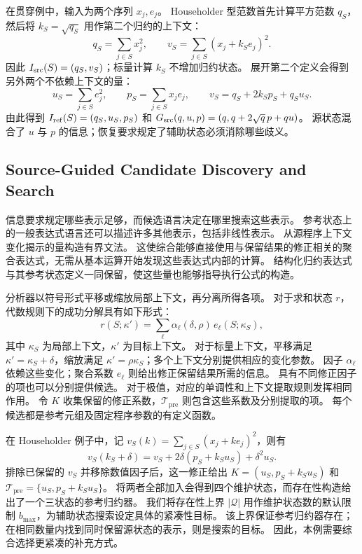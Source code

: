 在贯穿例中，输入为两个序列 $x_j,e_j$。
Householder 型范数首先计算平方范数 $q_S$，然后将 $k_S=\sqrt{q_S}$ 用作第二个归约的上下文：
\[
q_S=\sum_{j\in S}x_j^2,\qquad
v_S=\sum_{j\in S}(x_j+k_Se_j)^2.
\]
因此 $I_{\mathrm{src}}(S)=(q_S,v_S)$；标量计算 $k_S$ 不增加归约状态。
展开第二个定义会得到另外两个不依赖上下文的量：
\[
u_S=\sum_{j\in S}e_j^2,\qquad
p_S=\sum_{j\in S}x_je_j,\qquad
v_S=q_S+2k_Sp_S+q_Su_S.
\]
由此得到 $I_{\mathrm{ref}}(S)=(q_S,u_S,p_S)$ 和
$G_{\mathrm{src}}(q,u,p)=(q,q+2\sqrt q\,p+qu)$。
源状态混合了 $u$ 与 $p$ 的信息；恢复要求规定了辅助状态必须消除哪些歧义。

\subsection{Source-Guided Candidate Discovery and Search}
\label{sec:synthesis}

信息要求规定哪些表示足够，而候选语言决定在哪里搜索这些表示。
参考状态上的一般表达式语言还可以描述许多其他表示，包括非线性表示。
\sys 从源程序上下文变化揭示的量构造有界文法。
这使综合能够直接使用与保留结果的修正相关的聚合表达式，无需从基本运算开始发现这些表达式内部的计算。
结构化归约表达式与其参考状态定义一同保留，使这些量也能够指导执行公式的构造。

分析器以符号形式平移或缩放局部上下文，再分离所得各项。
对于求和状态 $r$，代数规则下的成功分解具有如下形式：
\begin{equation}
\label{eq:features}
r(S;\kappa')=\sum_{\ell}\alpha_\ell(\delta,\rho)\,e_\ell(S;\kappa_S),
\end{equation}
其中 $\kappa_S$ 为局部上下文，$\kappa'$ 为目标上下文。
对于标量上下文，平移满足 $\kappa'=\kappa_S+\delta$，缩放满足 $\kappa'=\rho\kappa_S$；多个上下文分别提供相应的变化参数。
因子 $\alpha_\ell$ 依赖这些变化；聚合系数 $e_\ell$ 则给出修正保留结果所需的信息。
具有不同修正因子的项也可以分别提供候选。
对于极值，对应的单调性和上下文提取规则发挥相同作用。
令 $K$ 收集保留的修正系数，$\mathcal T_{\mathrm{pre}}$ 则包含这些系数及分别提取的项。
每个候选都是参考元组及固定程序参数的有定义函数。

在 Householder 例子中，记 $v_S(k)=\sum_{j\in S}(x_j+ke_j)^2$，则有
\[
v_S(k_S+\delta)
 =v_S+2\delta(p_S+k_Su_S)+\delta^2u_S.
\]
排除已保留的 $v_S$ 并移除数值因子后，这一修正给出 $K=(u_S,p_S+k_Su_S)$ 和 $\mathcal T_{\mathrm{pre}}=\{u_S,p_S+k_Su_S\}$。
将两者全部加入会得到四个维护状态，而存在性构造给出了一个三状态的参考归约器。
我们将存在性上界 $|\mathcal Q|$ 用作维护状态数的默认限制 $b_{\max}$，为辅助状态搜索设定具体的紧凑性目标。
该上界保证参考归约器存在；在相同数量内找到同时保留源状态的表示，则是搜索的目标。
因此，本例需要综合选择更紧凑的补充方式。

